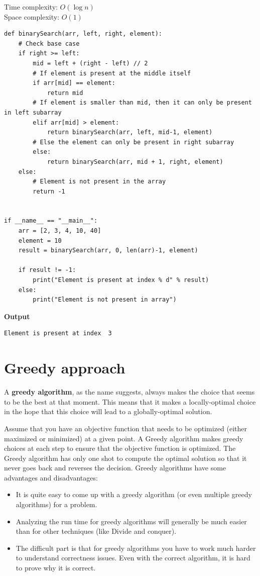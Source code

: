 \documentclass[a4paper,11pt]{book}
\begin{document}
\noindent Time complexity: $O(\log n)$\\
\noindent Space complexity: $O(1)$

\begin{lstlisting}
def binarySearch(arr, left, right, element):
    # Check base case
    if right >= left:
        mid = left + (right - left) // 2
        # If element is present at the middle itself
        if arr[mid] == element:
            return mid
        # If element is smaller than mid, then it can only be present in left subarray
        elif arr[mid] > element:
            return binarySearch(arr, left, mid-1, element)
        # Else the element can only be present in right subarray
        else:
            return binarySearch(arr, mid + 1, right, element)
    else:
        # Element is not present in the array
        return -1
  
  
if __name__ == "__main__":
    arr = [2, 3, 4, 10, 40]
    element = 10
    result = binarySearch(arr, 0, len(arr)-1, element)
    
    if result != -1:
        print("Element is present at index % d" % result)
    else:
        print("Element is not present in array")
\end{lstlisting}
\textbf{Output}
\begin{lstlisting}
Element is present at index  3
\end{lstlisting}

\section{Greedy approach}

\noindent A \textbf{greedy algorithm}, as the name suggests, always makes the choice that seems to be the best at that moment. This means that it makes a locally-optimal choice in the hope that this choice will lead to a globally-optimal solution.

\noindent Assume that you have an objective function that needs to be optimized (either maximized or minimized) at a given point. A Greedy algorithm makes greedy choices at each step to ensure that the objective function is optimized. The Greedy algorithm has only one shot to compute the optimal solution so that it never goes back and reverses the decision. Greedy algorithms have some advantages and disadvantages:
\begin{itemize}
    \item It is quite easy to come up with a greedy algorithm (or even multiple greedy algorithms) for a problem.
    \item Analyzing the run time for greedy algorithms will generally be much easier than for other techniques (like Divide and conquer).
    \item The difficult part is that for greedy algorithms you have to work much harder to understand correctness issues. Even with the correct algorithm, it is hard to prove why it is correct.
\end{itemize}
\end{document}
